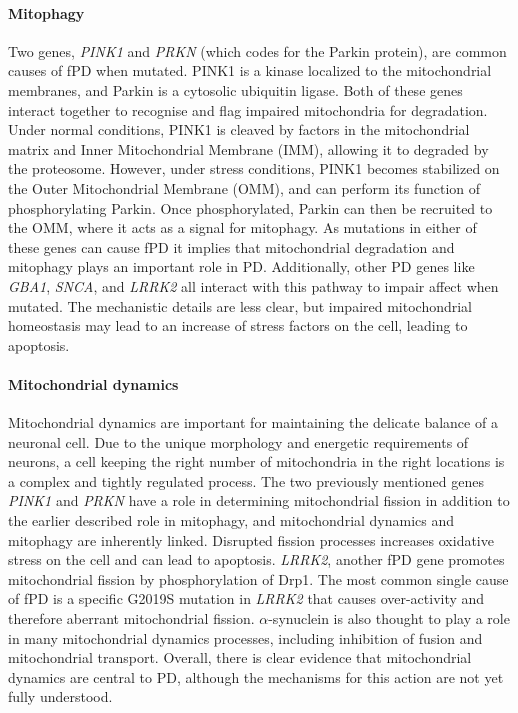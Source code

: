 \documentclass{article}
\begin{document}
\paragraph{Mitophagy}Two genes, \textit{PINK1} and \textit{PRKN} (which codes for the Parkin protein), are common causes of fPD when mutated\cite{Malpartida2021MitochondrialTherapy}. PINK1 is a kinase localized to the mitochondrial membranes\cite{Narendra2010PINK1Parkin}, and Parkin is a cytosolic ubiquitin ligase\cite{Narendra2008ParkinAutophagy}. Both of these genes interact together to recognise and flag impaired mitochondria for degradation. Under normal conditions, PINK1 is cleaved by factors in the mitochondrial matrix and Inner Mitochondrial Membrane (IMM), allowing it to degraded by the proteosome\cite{Pickles2018MitophagyMaintenance}. However, under stress conditions, PINK1 becomes stabilized on the Outer Mitochondrial Membrane (OMM), and can perform its function of phosphorylating Parkin. Once phosphorylated, Parkin can then be recruited to the OMM, where it acts as a signal for mitophagy. As mutations in either of these genes can cause fPD it implies that mitochondrial degradation and mitophagy plays an important role in PD. Additionally, other PD genes like \textit{GBA1}, \textit{SNCA}, and \textit{LRRK2} all interact with this pathway to impair affect when mutated\cite{Malpartida2021MitochondrialTherapy}. The mechanistic details are less clear, but impaired mitochondrial homeostasis may lead to an increase of stress factors on the cell, leading to apoptosis\cite{Eldeeb2022MitochondrialDisease}.
\paragraph{Mitochondrial dynamics}Mitochondrial dynamics are important for maintaining the delicate balance of a neuronal cell\cite{Chen2009MitochondrialDiseases}. Due to the unique morphology and energetic requirements of neurons, a cell keeping the right number of mitochondria in the right locations is a complex and tightly regulated process. The two previously mentioned genes \textit{PINK1} and \textit{PRKN} have a role in determining mitochondrial fission in addition to the earlier described role in mitophagy, and mitochondrial dynamics and mitophagy are inherently linked\cite{Archer2013MitochondrialDiseases}. Disrupted fission processes increases oxidative stress on the cell and can lead to apoptosis. \textit{LRRK2}, another fPD gene promotes mitochondrial fission by phosphorylation of Drp1. The most common single cause of fPD is a specific G2019S mutation in \textit{LRRK2} that causes over-activity and therefore aberrant mitochondrial fission\cite{Su2013InhibitionMutation}. $\alpha$-synuclein is also thought to play a role in many mitochondrial dynamics processes, including inhibition of fusion and mitochondrial transport\cite{Valdinocci2019IntracellularDisease}. Overall, there is clear evidence that mitochondrial dynamics are central to PD, although the mechanisms for this action are not yet fully understood.
\end{document}
